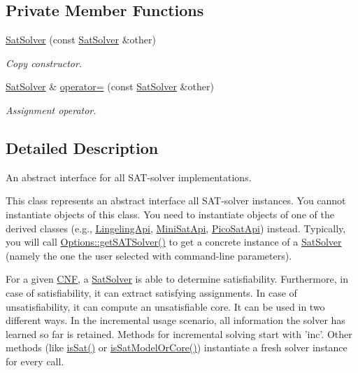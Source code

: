 \subsection*{Private Member Functions}
\begin{DoxyCompactItemize}
\item 
\hyperlink{classSatSolver_a0821aa3a3fababd9b070f758b6e788cc}{Sat\-Solver} (const \hyperlink{classSatSolver}{Sat\-Solver} \&other)
\begin{DoxyCompactList}\small\item\em Copy constructor. \end{DoxyCompactList}\item 
\hyperlink{classSatSolver}{Sat\-Solver} \& \hyperlink{classSatSolver_a9dc824ecbeaf4f0505403b284f6fe047}{operator=} (const \hyperlink{classSatSolver}{Sat\-Solver} \&other)
\begin{DoxyCompactList}\small\item\em Assignment operator. \end{DoxyCompactList}\end{DoxyCompactItemize}


\subsection{Detailed Description}
An abstract interface for all S\-A\-T-\/solver implementations. 

This class represents an abstract interface all S\-A\-T-\/solver instances. You cannot instantiate objects of this class. You need to instantiate objects of one of the derived classes (e.\-g., \hyperlink{classLingelingApi}{Lingeling\-Api}, \hyperlink{classMiniSatApi}{Mini\-Sat\-Api}, \hyperlink{classPicoSatApi}{Pico\-Sat\-Api}) instead. Typically, you will call \hyperlink{classOptions_aed3731b7c89433cd485cff35ca4bdcd7}{Options\-::get\-S\-A\-T\-Solver()} to get a concrete instance of a \hyperlink{classSatSolver}{Sat\-Solver} (namely the one the user selected with command-\/line parameters).

For a given \hyperlink{classCNF}{C\-N\-F}, a \hyperlink{classSatSolver}{Sat\-Solver} is able to determine satisfiability. Furthermore, in case of satisfiability, it can extract satisfying assignments. In case of unsatisfiability, it can compute an unsatisfiable core. It can be used in two different ways. In the incremental usage scenario, all information the solver has learned so far is retained. Methods for incremental solving start with 'inc'. Other methods (like \hyperlink{classSatSolver_a82f60f60db464fbe5c66a20ad673a573}{is\-Sat()} or \hyperlink{classSatSolver_ad5cfce08969be5aaf5cd705c12c68818}{is\-Sat\-Model\-Or\-Core()}) instantiate a fresh solver instance for every call.

